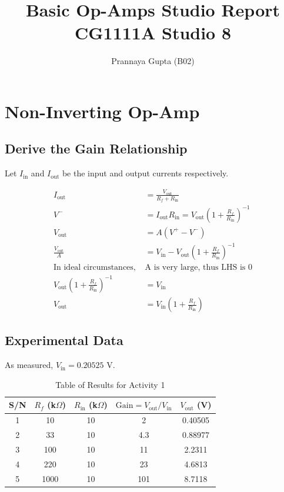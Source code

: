 \documentclass[a4paper,12pt,oneside, tikz]{book}
\title{\textbf{Basic Op-Amps} Studio Report \\ CG1111A Studio 8}
\author{Prannaya Gupta (B02)}
\begin{document}
\maketitle

\chapter{Non-Inverting Op-Amp}

\section{Derive the Gain Relationship}
\begin{tcolorbox}
Let $I_\text{in}$ and $I_\text{out}$ be the input and output currents respectively.

\begin{align*}
    I_\text{out} &= \frac{V_\text{out}}{R_f + R_\text{in}} \\
    V^- &= I_\text{out} R_\text{in} = V_\text{out} \left(1 + \frac{R_f}{R_\text{in}} \right)^{-1} \\
    V_\text{out} &= A(V^+ - V^-) \\
    \frac{V_\text{out}}{A} &= V_\text{in} - V_\text{out} \left(1 + \frac{R_f}{R_\text{in}} \right)^{-1} \\
    \text{In ideal circumstances, }&\text{A is very large, thus LHS is 0} \\
    V_\text{out} \left(1 + \frac{R_f}{R_\text{in}} \right)^{-1} &= V_\text{in} \\
    V_\text{out} &= V_\text{in}\left(1 + \frac{R_f}{R_\text{in}} \right)
\end{align*}
\end{tcolorbox}

\section{Experimental Data}
As measured, $V_\text{in} = 0.20525$ V.

\begin{table}[H]
    \centering
    \begin{tabular}{|c|c|c|c|c|}
        \hline S/N & $R_f$ (k$\Omega$) & $R_\text{in}$ (k$\Omega$) & $\text{Gain} = V_\text{out} / V_\text{in}$ & $V_\text{out}$ (V) \\
        \hline 1 & 10 & 10 & 2 & 0.40505 \\
               2 & 33 & 10 & 4.3 & 0.88977 \\
               3 & 100 & 10 & 11 & 2.2311 \\
               4 & 220 & 10 & 23 & 4.6813 \\
               5 & 1000 & 10 & 101 & 8.7118  \\
        \hline
    \end{tabular}
    \caption{Table of Results for Activity 1}
    \label{tab:act1}
\end{table}
\end{document}
